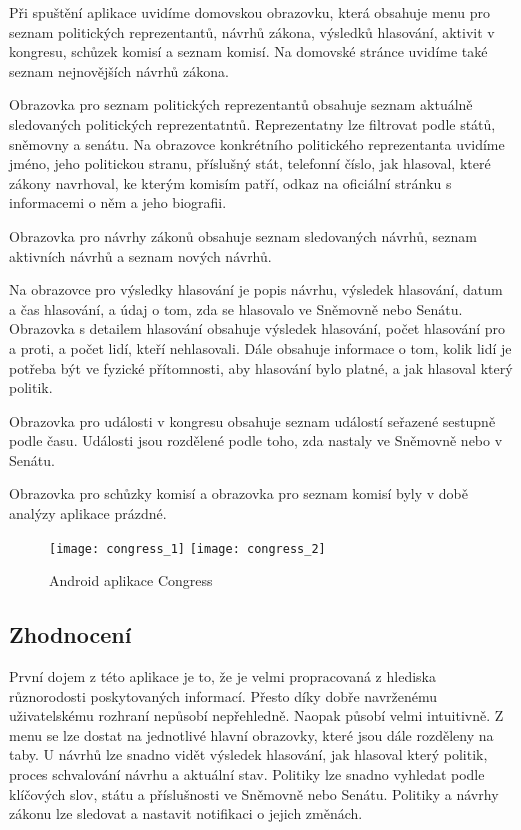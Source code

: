 Při spuštění aplikace uvidíme domovskou obrazovku, která obsahuje menu pro seznam politických reprezentantů, návrhů zákona, výsledků hlasování, aktivit v kongresu, schůzek komisí \linebreak a seznam komisí. Na domovské stránce uvidíme také seznam nejnovějších návrhů zákona. 

Obrazovka pro seznam politických reprezentantů obsahuje seznam aktuálně sledovaných politických reprezentatntů. Reprezentatny lze filtrovat podle států, sněmovny a senátu. Na obrazovce konkrétního politického reprezentanta uvidíme jméno, jeho politickou stranu, příslušný stát, telefonní číslo, jak hlasoval, které zákony navrhoval, ke kterým komisím patří, odkaz na oficiální stránku s informacemi o něm a jeho biografii. 

\noindent Obrazovka pro návrhy zákonů obsahuje seznam sledovaných návrhů, seznam aktivních návrhů \linebreak a seznam nových návrhů.

Na obrazovce pro výsledky hlasování je popis návrhu, výsledek hlasování, datum a čas hlasování, a údaj o tom, zda se hlasovalo ve Sněmovně nebo Senátu. Obrazovka s detailem hlasování obsahuje výsledek hlasování, počet hlasování pro a proti, a počet lidí, kteří nehlasovali. Dále obsahuje informace o tom, kolik lidí je potřeba být ve fyzické přítomnosti, aby hlasování bylo platné, a jak hlasoval který politik.

Obrazovka pro události v kongresu obsahuje seznam událostí seřazené sestupně podle času. Události jsou rozdělené podle toho, zda nastaly ve Sněmovně nebo v Senátu. 

Obrazovka pro schůzky komisí a obrazovka pro seznam komisí byly v době analýzy aplikace prázdné.
 
\begin{figure}
	\centering
	
	\texttt{[image: congress\_1]}
	\texttt{[image: congress\_2]}
	
	\caption{Android aplikace Congress \cite{congress}}
	\label{fig:politoscope}
\end{figure}

\subsection{Zhodnocení}
První dojem z této aplikace je to, že je velmi propracovaná z hlediska různorodosti poskytovaných informací. Přesto díky dobře navrženému uživatelskému rozhraní nepůsobí nepřehledně. Naopak působí velmi intuitivně. Z menu se lze dostat na jednotlivé hlavní obrazovky, které jsou dále rozděleny na taby. U návrhů lze snadno vidět výsledek hlasování, jak hlasoval který \linebreak politik, proces schvalování návrhu a aktuální stav. Politiky lze snadno vyhledat podle klíčových slov, státu a příslušnosti ve Sněmovně nebo Senátu. Politiky a návrhy zákonu lze sledovat \linebreak a nastavit notifikaci o jejich změnách.

